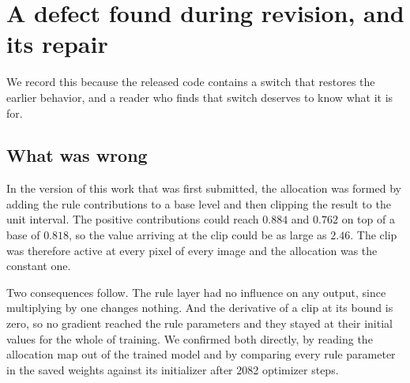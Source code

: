 \section{A defect found during revision, and its repair}
\label{sec:supp_defect}

We record this because the released code contains a switch that restores the earlier behavior, and a
reader who finds that switch deserves to know what it is for.

\subsection{What was wrong}
In the version of this work that was first submitted, the allocation was formed by adding the rule
contributions to a base level and then clipping the result to the unit interval. The positive
contributions could reach $0.884$ and $0.762$ on top of a base of $0.818$, so the value arriving at
the clip could be as large as $2.46$. The clip was therefore active at every pixel of every image and
the allocation was the constant one.

Two consequences follow. The rule layer had no influence on any output, since multiplying by one
changes nothing. And the derivative of a clip at its bound is zero, so no gradient reached the rule
parameters and they stayed at their initial values for the whole of training. We confirmed both
directly, by reading the allocation map out of the trained model and by comparing every rule
parameter in the saved weights against its initializer after 2082 optimizer steps.

